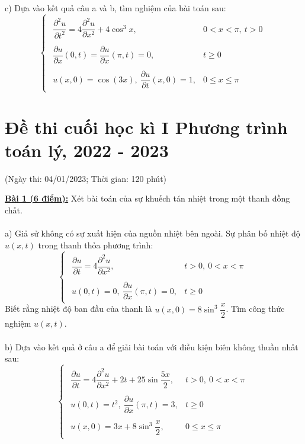 \documentclass[10.5pt, a4paper]{article}
\begin{document}
\color{red}c) \color{black}Dựa vào kết quả câu a và b, tìm nghiệm của bài toán sau: $$\begin{cases}
\begin{array}{ll}
	\dfrac{\partial^2u}{\partial t^2}=4\dfrac{\partial^2u}{\partial x^2}+4\cos^3x, & 0<x<\pi,~t>0\\\\
	\dfrac{\partial u}{\partial x}(0,t)=\dfrac{\partial u}{\partial x}(\pi,t)=0, & t\ge0\\\\
	u(x,0)=\cos(3x),~\dfrac{\partial u}{\partial t}(x,0)=1, & 0\le x\le\pi
	\end{array}
\end{cases}$$
\newpage

\section{Đề thi cuối học kì I Phương trình toán lý, 2022 - 2023}
\begin{center}
	\color{blue}(Ngày thi: 04/01/2023; Thời gian: 120 phút)
\end{center}
\color{red}\underline{\textbf{Bài 1 (6 điểm):}} \color{black}Xét bài toán của sự khuếch tán nhiệt trong một thanh đồng chất.\\\\
\color{red}a) \color{black}Giả sử không có sự xuất hiện của nguồn nhiệt bên ngoài. Sự phân bố nhiệt độ $u(x,t)$ trong thanh thỏa phương trình: $$\begin{cases}
\begin{array}{ll}
\dfrac{\partial u}{\partial t}=4\dfrac{\partial^2u}{\partial x^2}, & t>0,~0<x<\pi\\\\
u(0,t)=0,~\dfrac{\partial u}{\partial x}(\pi,t)=0, & t\ge0
\end{array}
\end{cases}$$
Biết rằng nhiệt độ ban đầu của thanh là $u(x,0)=8\sin^3\dfrac x2$. Tìm công thức nghiệm $u(x,t)$.\\\\
\color{red}b) \color{black} Dựa vào kết quả ở câu a để giải bài toán với điều kiện biên không thuần nhất sau: $$\begin{cases}
\begin{array}{ll}
\dfrac{\partial u}{\partial t}=4\dfrac{\partial^2u}{\partial x^2}+2t+25\sin\dfrac{5x}{2}, & t>0,~0<x<\pi\\\\
u(0,t)=t^2,~\dfrac{\partial u}{\partial x}(\pi,t)=3, & t\ge0\\\\
u(x,0)=3x+8\sin^3\dfrac x2, & 0\le x\le\pi
\end{array}
\end{cases}$$
\end{document}
